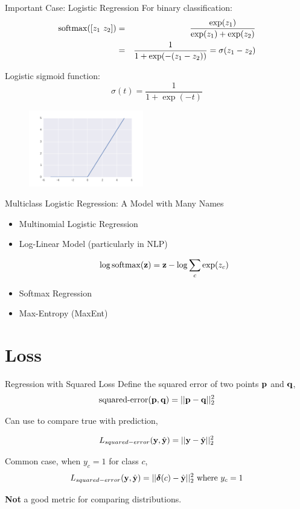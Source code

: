 \documentclass{beamer}
\begin{document}
\begin{frame}{Important Case: Logistic Regression}
  For binary classification:
  \begin{eqnarray*}
   \softmax([z_1\ z_2]) &=& \frac{\exp(z_1)}{\exp(z_1) + \exp(z_2)} \\
 &=& \frac{1}{1 + \exp(-(z_1-z_2))} = \sigma(z_1 -z_2)
  \end{eqnarray*}

  Logistic sigmoid function:
  \[\sigma(t) = \frac{1}{1 + \exp(-t)} \]
  \begin{figure}
    \centering
    \includegraphics[width=5cm]{../notebooks/Relu}
  \end{figure}
\end{frame}

\begin{frame}{Multiclass Logistic Regression: A Model with Many Names}
  \begin{itemize}
  \item  Multinomial Logistic Regression


  \item Log-Linear Model (particularly in NLP)
    
    \[\log \softmax(\boldz) = \boldz - \log \sum_{c} \exp(z_c)  \]

    
  \item Softmax Regression
    
    
  \item Max-Entropy (MaxEnt)
    
    
  \end{itemize}
\end{frame}

\section{Loss}

\begin{frame}{Regression with Squared Loss }
  Define the squared error of two points $\mathbf{p}$ and $\mathbf{q}$, 
  \[ \textrm{squared-error}(\mathbf{p}, \mathbf{q})= ||\mathbf{p} - \mathbf{q}||^2_2  \]

  Can use to compare true with prediction,

  \[L_{squared-error}(\mathbf{y}, \hat{\mathbf{y}}) = ||\mathbf{y} - \hat{\mathbf{y}}||^2_2 \]

  Common case, when $y_c = 1$ for class $c$,
  \[L_{squared-error}(\mathbf{y}, \hat{\mathbf{y}}) = ||\boldsymbol{\delta}(c) - \hat{\mathbf{y}} ||_2^2  \mathrm{\ where\ }y_c = 1 \]

  \textbf{Not} a good metric for comparing distributions.
\end{frame}
\end{document}
